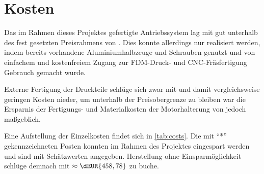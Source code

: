 	\section{Kosten}\label{sec:cost}
		Das im Rahmen dieses Projektes gefertigte Antriebssystem lag mit  gut unterhalb des fest gesetzten Preisrahmens von .
		Dies konnte allerdings nur realisiert werden, indem bereits vorhandene Aluminiumhalbzeuge und Schrauben genutzt und von einfachem und kostenfreiem Zugang zur FDM-Druck- und CNC-Fräsfertigung Gebrauch gemacht wurde.

		Externe Fertigung der Druckteile schlüge sich zwar mit  und damit vergleichsweise geringen Kosten nieder, um unterhalb der Preisobergrenze zu bleiben war die Ersparnis der Fertigungs- und Materialkosten der Motorhalterung von  jedoch maßgeblich.\par\medskip
		Eine Aufstellung der Einzelkosten findet sich in \cref{tab:costs}.
		Die mit ``*'' gekennzeichneten Posten konnten im Rahmen des Projektes eingespart werden und sind mit Schätzwerten angegeben.
		Herstellung ohne Einsparmöglichkeit schlüge demnach mit \(\approx \dEUR{458,78}\) zu buche.
